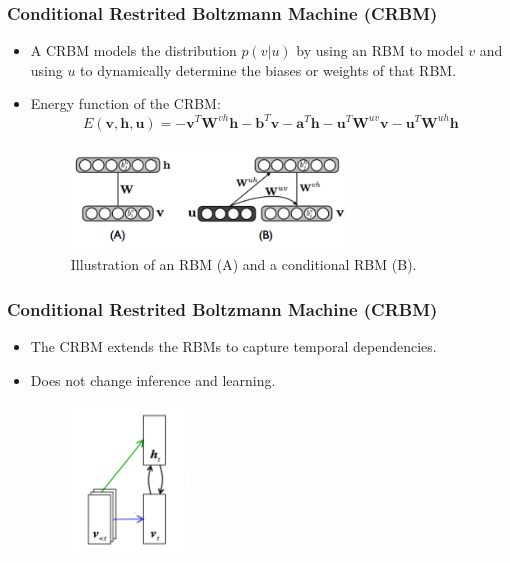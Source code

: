 \documentclass{beamer}
\begin{document}

\begin{frame}
\frametitle{Conditional Restrited Boltzmann Machine (CRBM)}
\begin{itemize}
\item A CRBM models the distribution $p(v|u)$ by using an RBM to model $v$ and using $u$ to dynamically
determine the biases or weights of that RBM. 
\item Energy function of the CRBM:
\begin{equation}
E(\mathbf{v, h, u})=-\mathbf{v}^T\mathbf{W}^{vh}\mathbf{h}-\mathbf{b}^T\mathbf{v}-\mathbf{a}^T\mathbf{h}-\mathbf{u}^T\mathbf{W}^{uv}\mathbf{v}-\mathbf{u}^T\mathbf{W}^{uh}\mathbf{h}
\end{equation}
\begin{figure}
\centering
  \includegraphics[width=0.7\textwidth]{figs/crbm.png}
  \caption{Illustration of an RBM (A) and a conditional
  RBM (B).}
\end{figure}
\end{itemize}
\end{frame}

\begin{frame}
\frametitle{Conditional Restrited Boltzmann Machine (CRBM)}
\begin{itemize}

\item The CRBM extends the RBMs to capture temporal dependencies.
\item Does not change inference and learning.
\begin{figure}
\centering
  \includegraphics[width=0.3\textwidth]{figs/crbm2.png}
\end{figure}
\end{itemize}
\end{frame}
\end{document}
